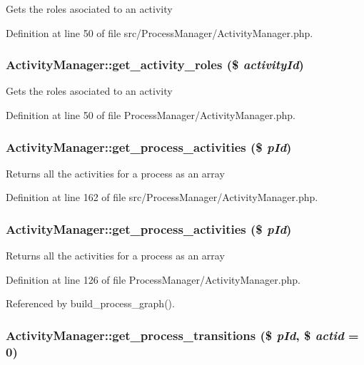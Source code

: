 Gets the roles asociated to an activity 

Definition at line 50 of file src/Process\-Manager/Activity\-Manager.php.
\subsubsection{\setlength{\rightskip}{0pt plus 5cm}Activity\-Manager::get\_\-activity\_\-roles (\$ {\em activity\-Id})}\label{classActivityManager_a3}


Gets the roles asociated to an activity 

Definition at line 50 of file Process\-Manager/Activity\-Manager.php.
\subsubsection{\setlength{\rightskip}{0pt plus 5cm}Activity\-Manager::get\_\-process\_\-activities (\$ {\em p\-Id})}\label{classActivityManager_a27}


Returns all the activities for a process as an array 

Definition at line 162 of file src/Process\-Manager/Activity\-Manager.php.
\subsubsection{\setlength{\rightskip}{0pt plus 5cm}Activity\-Manager::get\_\-process\_\-activities (\$ {\em p\-Id})}\label{classActivityManager_a8}


Returns all the activities for a process as an array 

Definition at line 126 of file Process\-Manager/Activity\-Manager.php.

Referenced by build\_\-process\_\-graph().
\subsubsection{\setlength{\rightskip}{0pt plus 5cm}Activity\-Manager::get\_\-process\_\-transitions (\$ {\em p\-Id}, \$ {\em actid} = 0)}\label{classActivityManager_a25}


